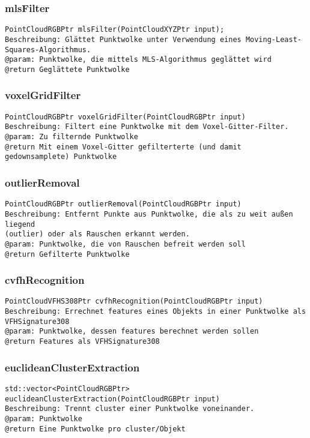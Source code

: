 \documentclass{suturo}
\begin{document}
\subsubsection{mlsFilter}
\begin{verbatim}
PointCloudRGBPtr mlsFilter(PointCloudXYZPtr input);
Beschreibung: Glättet Punktwolke unter Verwendung eines Moving-Least-Squares-Algorithmus.
@param: Punktwolke, die mittels MLS-Algorithmus geglättet wird
@return Geglättete Punktwolke
\end{verbatim}\label{func:mlsfilter}

\subsubsection{voxelGridFilter}
\begin{verbatim}
PointCloudRGBPtr voxelGridFilter(PointCloudRGBPtr input)
Beschreibung: Filtert eine Punktwolke mit dem Voxel-Gitter-Filter.
@param: Zu filternde Punktwolke
@return Mit einem Voxel-Gitter gefilterterte (und damit gedownsamplete) Punktwolke
\end{verbatim}\label{func:voxelgridfilter}

\subsubsection{outlierRemoval}
\begin{verbatim}
PointCloudRGBPtr outlierRemoval(PointCloudRGBPtr input)
Beschreibung: Entfernt Punkte aus Punktwolke, die als zu weit außen liegend
(outlier) oder als Rauschen erkannt werden.
@param: Punktwolke, die von Rauschen befreit werden soll
@return Gefilterte Punktwolke
\end{verbatim}\label{func:outlierremoval}

\subsubsection{cvfhRecognition}
\begin{verbatim}
PointCloudVFHS308Ptr cvfhRecognition(PointCloudRGBPtr input)
Beschreibung: Errechnet features eines Objekts in einer Punktwolke als VFHSignature308
@param: Punktwolke, dessen features berechnet werden sollen
@return Features als VFHSignature308
\end{verbatim}\label{func:cvfhRecognition}

\subsubsection{euclideanClusterExtraction}
\begin{verbatim}
std::vector<PointCloudRGBPtr> euclideanClusterExtraction(PointCloudRGBPtr input)
Beschreibung: Trennt cluster einer Punktwolke voneinander.
@param: Punktwolke
@return Eine Punktwolke pro cluster/Objekt
\end{verbatim}\label{func:euclideanClusterExtraction}
\end{document}
